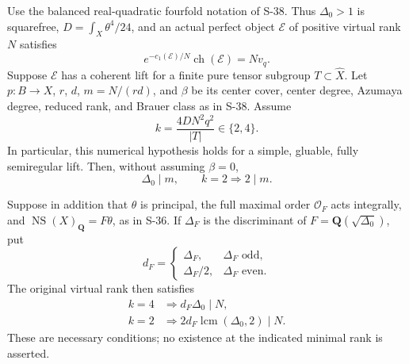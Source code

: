 \begin{theorem}
\label{thm:semireg-pure-tensor-unsplit-rank}
Use the balanced real-quadratic fourfold notation of S-38. Thus
$\Delta_0>1$ is squarefree, $D=\int_X\theta^4/24$, and an actual
perfect object $\mathcal E$ of positive virtual rank $N$ satisfies
\[
 e^{-c_1(\mathcal E)/N}\operatorname{ch}(\mathcal E)=Nv_q.
\]
Suppose $\mathcal E$ has a coherent lift for a finite pure tensor
subgroup $T\subset\widehat X$. Let $p:B\to X$, $r$, $d$, $m=N/(rd)$,
and $\beta$ be its center cover, center degree, Azumaya degree,
reduced rank, and Brauer class as in S-38. Assume
\[
 k=\frac{4DN^2q^2}{|T|}\in\{2,4\}.
 \tag{S40.1}
\]
In particular, this numerical hypothesis holds for a simple, gluable,
fully semiregular lift. Then, without assuming $\beta=0$,
\[
 \boxed{\Delta_0\mid m,\qquad k=2\Longrightarrow2\mid m.}
 \tag{S40.2}
\]

Suppose in addition that $\theta$ is principal, the full maximal
order $\mathcal O_F$ acts integrally, and
$\operatorname{NS}(X)_{\mathbf Q}=F\theta$, as in S-36. If
$\Delta_F$ is the discriminant of $F=\mathbf Q(\sqrt{\Delta_0})$,
put
\[
 d_F=\begin{cases}
 \Delta_F,&\Delta_F\text{ odd},\\
 \Delta_F/2,&\Delta_F\text{ even}.
 \end{cases}
\]
The original virtual rank then satisfies
\[
 \boxed{\begin{aligned}
 k=4&\Longrightarrow d_F\Delta_0\mid N,\\
 k=2&\Longrightarrow 2d_F\operatorname{lcm}(\Delta_0,2)\mid N.
 \end{aligned}}
 \tag{S40.3}
\]
These are necessary conditions; no existence at the indicated
minimal rank is asserted.
\end{theorem}
